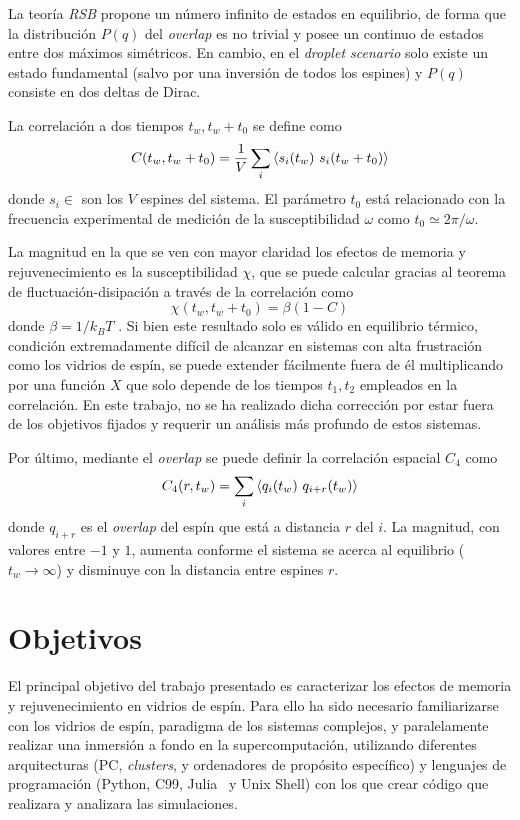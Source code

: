 \documentclass[11pt]{report}
\newcommand{\sub}[1]{ _{{\scriptscriptstyle \mathit{#1}}}  }
\newcommand{\kb}{k\sub{B}}
\begin{document}
La teoría \textit{RSB} propone un número infinito de estados en
equilibrio, de forma que la distribución $P(q)$ del \textit{overlap}
es no trivial y posee un continuo de estados entre dos máximos
simétricos. En cambio, en el \textit{droplet scenario} solo existe un
estado fundamental (salvo por una inversión de todos los espines) y
$P(q)$ consiste en dos deltas de Dirac.

La correlación a dos tiempos $t_w, t_w+t_0$ se define como
\begin{equation}
  C(t_w,t_w+t_0) = \frac{1}{V} \sum_{i}\expval{s_i(t_w)\ s_i
    (t_w+t_0)}
\end{equation}
donde $s_i∈$ son los $V$ espines del sistema. El parámetro $t_0$ está
relacionado con la frecuencia experimental de medición de la
susceptibilidad $ω$ como $t_0 ≃ 2π/ω$.

La magnitud en la que se ven con mayor claridad los efectos de memoria
y rejuvenecimiento es la susceptibilidad $χ$, que se puede calcular
gracias al teorema de fluctuación-disipación a través de la
correlación como
\begin{equation}
  χ(t_w, t_w+t_0) = β(1-C)
\end{equation}
donde $β=1/\kb T$ . Si bien este resultado solo es válido en
equilibrio térmico, condición extremadamente difícil de alcanzar en
sistemas con alta frustración como los vidrios de espín, se puede
extender fácilmente fuera de él multiplicando por una función $X$ que
solo depende de los tiempos $t_1,t_2$ empleados en la correlación. En
este trabajo, no se ha realizado dicha corrección por estar fuera de
los objetivos fijados y requerir un análisis más profundo de estos
sistemas.

Por último, mediante el \textit{overlap} se puede definir la
correlación espacial $C_4$ como
\begin{equation}
  C_4(r,t_w) =  \sum_{i} \expval{q_i(t_w)\ q_{i+r}(t_w)}
\end{equation}
donde $q_{i+r}$ es el \textit{overlap} del espín que está a distancia
$r$ del $i$. La magnitud, con valores entre $-1$ y $1$, aumenta
conforme el sistema se acerca al equilibrio ($t_w→∞$) y disminuye con
la distancia entre espines $r$.

\chapter{Objetivos}
El principal objetivo del trabajo presentado es caracterizar los
efectos de memoria y rejuvenecimiento en vidrios de espín. Para ello
ha sido necesario familiarizarse con los vidrios de espín, paradigma
de los sistemas complejos, y paralelamente realizar una inmersión a
fondo en la supercomputación, utilizando diferentes arquitecturas (PC,
\textit{clusters}, y ordenadores de propósito específico) y lenguajes
de programación (Python, C99, Julia~\cite{julialang} y Unix Shell)
con los que crear código que realizara y analizara las simulaciones.
\end{document}
